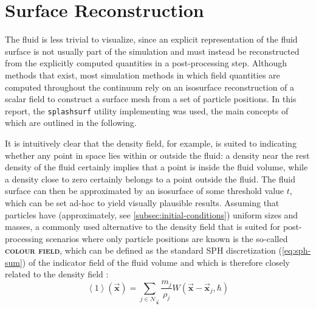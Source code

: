 \documentclass[oneside, a4paper]{book}
\newcommand\emphasis[1]{{\scshape\bfseries#1}}
\newcommand\angled[1]{\left\langle#1\right\rangle}
\newcommand\vek[1]{\vec{\bm{#1}}}
\newcommand\br[1]{\left(#1\right)}
\begin{document}
  \section{Surface Reconstruction}
  The fluid is less trivial to visualize, since an explicit representation of the fluid surface is not usually part of the simulation and must instead be reconstructed from the explicitly computed quantities in a post-processing step. Although methods that \autocite[explicitly operate on a surface representation]{surface-only-fluids} exist, most simulation methods in which field quantities are computed throughout the continuum rely on an isosurface reconstruction of a scalar field to construct a surface mesh from a set of particle positions. In this report, the \texttt{splashsurf} utility implementing \autocite[Weighted Laplacian Smoothing for Surface Recontruction]{laplacian-surf-reconst} was used, the main concepts of which are outlined in the following.
  
  It is intuitively clear that the density field, for example, is suited to indicating whether any point in space lies within or outside the fluid: a density near the rest density of the fluid certainly implies that a point is inside the fluid volume, while a density close to zero certainly belongs to a point outside the fluid. The fluid surface can then be approximated by an isosurface of some threshold value $t$, which can be set ad-hoc to yield visually plausible results. Assuming that particles have (approximately, see \autoref{subsec:initial-conditions}) uniform sizes and masses, a commonly used alternative to the density field that is suited for post-processing scenarios where only particle positions are known is the so-called \emphasis{colour field}, which can be defined as the standard SPH discretization (\autoref{eq:sph-sum}) of the indicator field of the fluid volume and which is therefore closely related to the density field \autocite{laplacian-surf-reconst}:
  \begin{equation}\label{eq:colour-field-def}
    \angled{1}\br{\vek{x}} = \sum_{j\in\mathcal{N}_{\vek{x}}} \frac{m_j}{\rho_j} W(\vek{x}-\vek{x}_j, \hbar)
  \end{equation}
  
\end{document}
